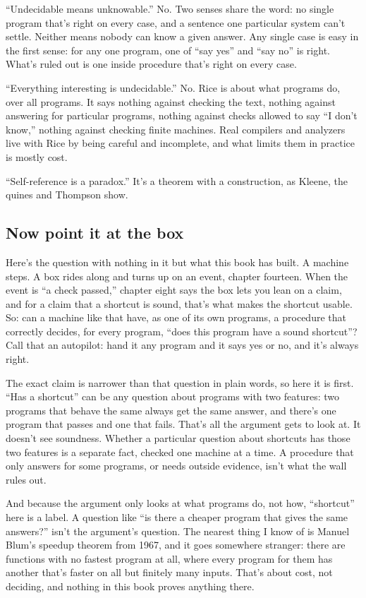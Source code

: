\documentclass[11pt,twoside]{article}
\theoremstyle{thielethm}
\theoremstyle{thieledef}
\theoremstyle{thieledef}
\theoremstyle{thieledef}
\theoremstyle{thielethm}
\theoremstyle{thieleobs}
\theoremstyle{thielethm}
\begin{document}
``Undecidable means unknowable.'' No. Two senses share the word: no single program that's right on every case, and a sentence one particular system can't settle. Neither means nobody can know a given answer. Any single case is easy in the first sense: for any one program, one of ``say yes'' and ``say no'' is right. What's ruled out is one inside procedure that's right on every case.

``Everything interesting is undecidable.'' No. Rice is about what programs do, over all programs. It says nothing against checking the text, nothing against answering for particular programs, nothing against checks allowed to say ``I don't know,'' nothing against checking finite machines. Real compilers and analyzers live with Rice by being careful and incomplete, and what limits them in practice is mostly cost.

``Self-reference is a paradox.'' It's a theorem with a construction, as Kleene, the quines and Thompson show.

\subsection{Now point it at the box}

Here's the question with nothing in it but what this book has built. A machine steps. A box rides along and turns up on an event, chapter fourteen. When the event is ``a check passed,'' chapter eight says the box lets you lean on a claim, and for a claim that a shortcut is sound, that's what makes the shortcut usable. So: can a machine like that have, as one of its own programs, a procedure that correctly decides, for every program, ``does this program have a sound shortcut''? Call that an autopilot: hand it any program and it says yes or no, and it's always right.

The exact claim is narrower than that question in plain words, so here it is first. ``Has a shortcut'' can be any question about programs with two features: two programs that behave the same always get the same answer, and there's one program that passes and one that fails. That's all the argument gets to look at. It doesn't see soundness. Whether a particular question about shortcuts has those two features is a separate fact, checked one machine at a time. A procedure that only answers for some programs, or needs outside evidence, isn't what the wall rules out.

And because the argument only looks at what programs do, not how, ``shortcut'' here is a label. A question like ``is there a cheaper program that gives the same answers?'' isn't the argument's question. The nearest thing I know of is Manuel Blum's speedup theorem from 1967, and it goes somewhere stranger: there are functions with no fastest program at all, where every program for them has another that's faster on all but finitely many inputs. That's about cost, not deciding, and nothing in this book proves anything there.
\end{document}
